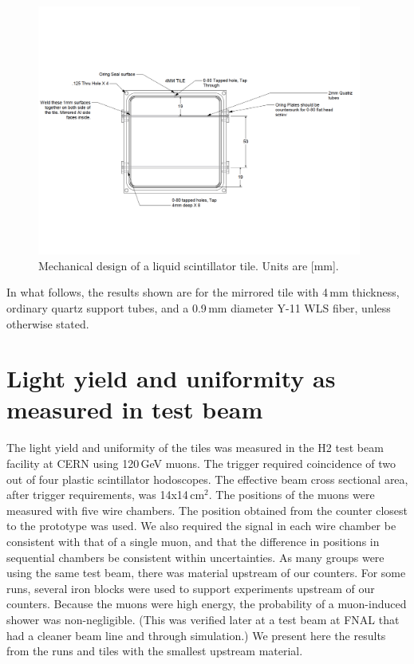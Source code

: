 \documentclass[review]{elsarticle}
\begin{document}
\begin{figure}[!ht]
\begin{center}
\includegraphics[width=0.95\textwidth]{./figures/mechanicaldesign.pdf}
\caption{Mechanical design of a liquid scintillator tile. Units are
  [mm].}
\label{fig:tiledesign}
\end{center}
\end{figure}

In what follows, the results shown are for the mirrored tile with 4\,mm
thickness, ordinary quartz support tubes, and a 0.9\,mm diameter Y-11 WLS fiber,
unless otherwise stated.

\section{Light yield and uniformity as measured in test beam}

The light yield and uniformity of the tiles was measured in the H2
test beam facility at CERN using 120\,GeV muons. The trigger required
coincidence of two out of four plastic scintillator hodoscopes. The
effective beam cross sectional area, after trigger requirements, was
14x14\,cm$^2$. The positions of the muons were measured with five
wire chambers. The position obtained from the counter closest to the
prototype was used. We also required the signal in each wire chamber
be consistent with that of a single muon, and that the difference in
positions in sequential chambers be consistent within uncertainties.
As many groups were using the same test beam, there was material
upstream of our counters. For some runs, several iron blocks were
used to support experiments upstream of our counters. Because the
muons were high energy, the probability of a muon-induced shower was
non-negligible. (This was verified later at a test beam at FNAL that
had a cleaner beam line and through simulation.) We present here the
results from the runs and tiles with the smallest upstream material.
\end{document}
